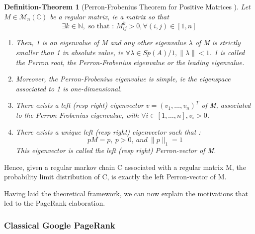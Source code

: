 \documentclass{article}
\newtheorem{definition-theo}{Definition-Theorem}[section]
\begin{document}
\begin{definition-theo}[Perron-Frobenius Theorem for Positive Matrices \cite{meyer_2000}]\label{def-theo:perron-frob}
Let $M \in \mathcal{M}_n(\mathbb{C})$ be a regular matrix, ie a matrix so that 
\begin{equation*}
    \exists k \in \mathbb{N}, \mbox{ so that : } M^k_{ij} > 0, \forall (i,j) \in [1, n]
\end{equation*}

\begin{enumerate}
    \item Then, 1 is an eigenvalue of M and any other eigenvalue $\lambda$ of M is strictly smaller than 1 in absolute value, ie $\forall \lambda \in Sp(A) / 1, \|\lambda\| < 1$. 1 is called the Perron root, the Perron-Frobenius eigenvalue or the leading eigenvalue.
    \item Moreover, the Perron-Frobenius eigenvalue is simple, ie the eigenspace associated to 1 is one-dimensional.
    \item There exists a left (resp right) eigenvector $v = (v_1, \hdots, v_n)^T$ of M, associated to the Perron-Frobenius eigenvalue, with $\forall i \in [1, \hdots, n], v_i > 0$.
    \item There exists a unique left (resp right) eigenvector such that : 
    \begin{equation*}
        p M = p, \ p>0, \ and \ \|p\|_1 = 1
    \end{equation*}
    This eigenvector is called the left (resp right) Perron-vector of M.

\end{enumerate}

\end{definition-theo}

Hence, given a regular markov chain C associated with a regular matrix M, the probability limit distribution of C, is exactly the left Perron-vector of M.

Having laid the theoretical framework, we can now explain the motivations that led to the PageRank elaboration. 

\subsubsection{Classical Google PageRank}
\end{document}
